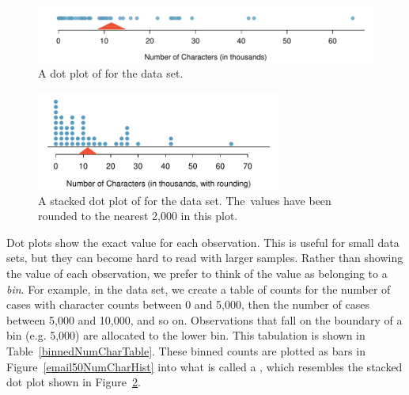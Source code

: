 \begin{doublespace}
\begin{figure}[h]
	\centering
	\includegraphics[width=\textwidth]{ch_intro_to_data_oi_biostat/figures/emailCharactersDotPlot/emailCharactersDotPlot}
	\caption{A dot plot of  for the  data set.}
	\label{emailCharactersDotPlot}
\end{figure}

\begin{figure}[h]
	\centering
	\includegraphics[width=0.72\textwidth]{ch_intro_to_data_oi_biostat/figures/emailCharactersDotPlot/emailCharactersDotPlotStacked}
	\caption{A stacked dot plot of  for the  data set. The~values have been rounded to the nearest 2,000 in this plot.}
	\label{emailCharactersDotPlotStacked}
\end{figure}

Dot plots show the exact value for each observation. This is useful for small data sets, but they can become hard to read with larger samples. Rather than showing the value of each observation, we prefer to think of the value as belonging to a \emph{bin}. For example, in the  data set, we create a table of counts for the number of cases with character counts between 0 and 5,000, then the number of cases between 5,000 and 10,000, and so on. Observations that fall on the boundary of a bin (e.g. 5,000) are allocated to the lower bin. This tabulation is shown in Table~\ref{binnedNumCharTable}. These binned counts are plotted as bars in Figure~\ref{email50NumCharHist} into what is called a , which resembles the stacked dot plot shown in Figure~\ref{emailCharactersDotPlotStacked}.


\end{doublespace}
